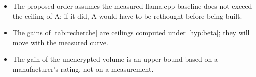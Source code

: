 \begin{faux}
\begin{itemize}
\item The proposed order assumes the measured llama.cpp baseline does not exceed the ceiling of A; if it did, A would have to be rethought before being built.
\item The gains of \cref{tab:recherche} are ceilings computed under \cref{hyp:beta}; they will move with the measured curve.
\item The gain of the unencrypted volume is an upper bound based on a manufacturer's rating, not on a measurement.
\end{itemize}
\end{faux}
